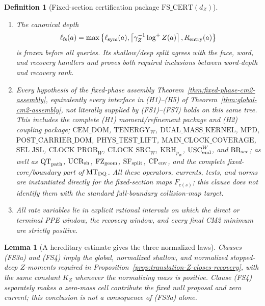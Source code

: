 \documentclass[11pt]{article}
\newtheorem{lemma}[theorem]{Lemma}
\newtheorem{definition}[theorem]{Definition}
\begin{document}
\begin{definition}[Fixed-section certification package
$\mathrm{FS\_CERT}(d_Z)$]
\begin{enumerate}[label=\textup{(FS\arabic*)}]
requires parameter-uniform cone and moving-cut bounds up to $L(s)$, in view
of Proposition~\ref{prop:translation-PPE4-parameter-countermodel}.
\item The canonical depth
\begin{equation}
 \ell_{\rm fs}(a)=\max\left\{\ell_{\rm sym}(a),
 \left\lceil\gamma_Z^{-1}\log^+Z(a)\right\rceil,
 R_{\rm entry}(a)\right\}
\label{eq:fixed-section-canonical-depth}
\end{equation}
is frozen before all queries.  Its shallow/deep split agrees with the face,
word, and recovery handlers and proves both required inclusions between
word-depth and recovery rank.
\item \begin{flushleft}Every hypothesis of the fixed-phase assembly
Theorem~\ref{thm:fixed-phase-cm2-assembly}, equivalently every interface in
\textup{(H1)--(H5)} of Theorem~\ref{thm:global-cm2-assembly}, not
literally supplied by \textup{(FS1)--(FS7)} holds on this same tree.  This
includes the complete \textup{(H1)} moment/refinement package and
\textup{(H2)} coupling package; $\mathrm{CEM\_DOM}$,
$\mathrm{TENERGY}_{W}$, $\mathrm{DUAL\_MASS\_KERNEL}$, $\mathrm{MPD}$,
$\mathrm{POST\_CARRIER\_DOM}$, $\mathrm{PHYS\_TEST\_LIFT}$,
$\mathrm{MAIN\_CLOCK\_COVERAGE}$, $\mathrm{SEL\_JSL}$,
$\mathrm{CLOCK\_PROB}_{W}$, $\mathrm{CLOCK\_SRC}_{W}$,
$\mathrm{KRH}_{p_W}$, $\mathrm{USC}_{\rm end}^{W}$, and
$\mathrm{BR}_{\rm sec}$; as well as $\mathrm{QT}_{\rm path}$,
$\mathrm{UCR}_{\rm sh}$, $\mathrm{FZ}_{\rm geom}$,
$\mathrm{SF}_{\rm split}$, $\mathrm{CP}_{\rm env}$, and the complete
fixed-core/boundary part of $\mathrm{MT}_{\rm DQ}$.
All these operators, currents, tests, and norms are instantiated directly for
the fixed-section maps $F_{c(s)}$; this clause does not identify them with the
standard full-boundary collision-map target.
\end{flushleft}
\item All rate variables lie in explicit rational intervals on which the
direct or terminal PPE window, the recovery window, and every final CM2
minimum are strictly positive.
\end{enumerate}
\end{definition}

\begin{lemma}[A hereditary estimate gives the three normalized laws]
\label{lem:fixed-section-hereditary-Z}
Clauses \textup{(FS3a)} and \textup{(FS4)} imply the global, normalized
shallow, and normalized stopped-deep $Z$-moments required in
Proposition~\ref{prop:translation-Z-closes-recovery}, with the same constant
$K_Z$ whenever the normalizing mass is positive.  Clause \textup{(FS4)}
separately makes a zero-mass cell contribute the fixed null proposal and zero
current; this conclusion is not a consequence of \textup{(FS3a)} alone.
\end{lemma}
\end{document}
